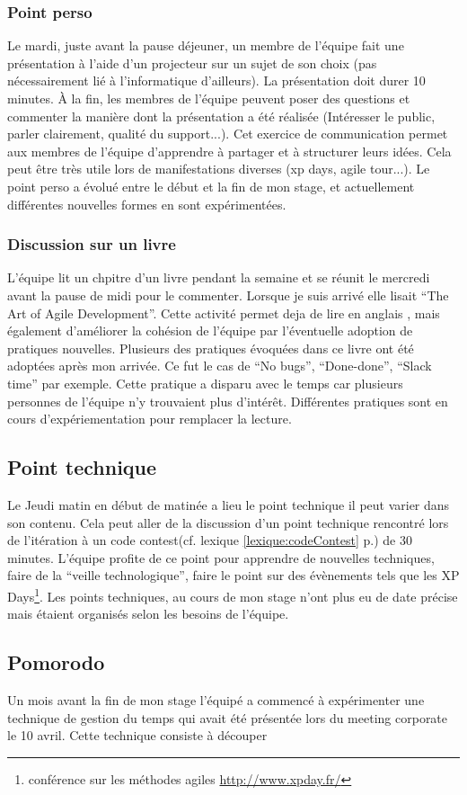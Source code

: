 \subsubsection{Point perso}
Le mardi, juste avant la pause déjeuner, un membre de l'équipe fait une présentation à l'aide d'un projecteur sur un sujet de son choix (pas nécessairement lié à l'informatique d'ailleurs). La présentation doit durer 10 minutes. À la fin, les membres de l'équipe peuvent poser des questions et commenter la manière dont la présentation a été réalisée (Intéresser le public, parler clairement, qualité du support...). Cet exercice de communication permet aux membres de l'équipe d'apprendre à partager et à structurer leurs idées. Cela peut être très utile lors de manifestations diverses (xp days, agile tour...). Le point perso a évolué entre le début et la fin de mon stage, et actuellement différentes nouvelles formes en sont expérimentées.

\subsubsection{Discussion sur un livre}
L'équipe lit un chpitre d'un livre pendant la semaine et se réunit le mercredi avant la pause de midi pour le commenter. Lorsque je suis arrivé elle lisait ``The Art of Agile Development''. Cette activité permet deja de lire en anglais , mais également d'améliorer la cohésion de l'équipe par l'éventuelle adoption de pratiques nouvelles. Plusieurs des pratiques évoquées dans ce livre ont été adoptées après mon arrivée. Ce fut le cas de ``No bugs'', ``Done-done'', ``Slack time'' par exemple. Cette pratique a disparu avec le temps car plusieurs personnes de l'équipe n'y trouvaient plus d'intérêt. Différentes pratiques sont en cours d'expériementation pour remplacer la lecture.

\subsection{Point technique}
Le Jeudi matin en début de matinée a lieu le point technique il peut varier dans son contenu. Cela peut aller de la discussion d'un point technique rencontré lors de l'itération à un code contest(cf. lexique \ref{lexique:codeContest} p.\pageref{lexique:codeContest}) de 30 minutes. L'équipe profite de ce point pour apprendre de nouvelles techniques, faire de la ``veille technologique'', faire le point sur des évènements tels que les XP Days\footnote{conférence sur les méthodes agiles \url{http://www.xpday.fr/}}. Les points techniques, au cours de mon stage n'ont plus eu de date précise mais étaient organisés selon les besoins de l'équipe.

\subsection{Pomorodo}
Un mois avant la fin de mon stage l'équipé a commencé à expérimenter une technique de gestion du temps qui avait été présentée lors du meeting corporate le 10 avril. Cette technique consiste à découper 

